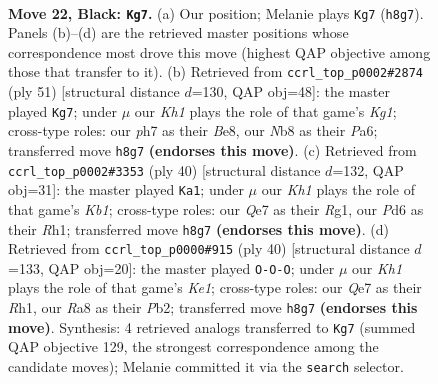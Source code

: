 \documentclass[11pt]{article}
\begin{document}
\clearpage

\begin{figure}[p]\centering
\begin{subfigure}{0.46\textwidth}\centering
\resizebox{\linewidth}{!}{%
\newchessgame
\chessboard[
  setfen={rn2r2k/p2nqp1P/3p1b2/1RpP2p1/4P1P1/1PNQ4/4N3/2B1K2R b K - 2 22},
  showmover=false,
  pgfstyle=straightmove, color=movearrow, markmove={h8-g7}
]}
\caption{}
\end{subfigure}\hfill
\begin{subfigure}{0.46\textwidth}\centering
\resizebox{\linewidth}{!}{%
\newchessgame
\chessboard[
  setfen={3rb1k1/5p1p/p1nq1np1/8/2pPP3/P1N4P/2BQN1P1/5RK1 b - - 2 26},
  showmover=false,
  pgfstyle=straightmove, color=movearrow, markmove={g8-g7}
]}
\caption{}
\end{subfigure}
\\[4pt]
\begin{subfigure}{0.46\textwidth}\centering
\resizebox{\linewidth}{!}{%
\newchessgame
\chessboard[
  setfen={r6k/pb2q1np/1p1p1np1/3Ppr2/7P/P1N1PN2/1PQ1BP2/1K4RR w - - 3 21},
  showmover=false,
  pgfstyle=straightmove, color=movearrow, markmove={b1-a1}
]}
\caption{}
\end{subfigure}\hfill
\begin{subfigure}{0.46\textwidth}\centering
\resizebox{\linewidth}{!}{%
\newchessgame
\chessboard[
  setfen={r4qnk/pp1n2rp/3p4/P1pPpb2/4N3/2N2BP1/1PP1QP2/R3K2R w KQ - 3 21},
  showmover=false,
  pgfstyle=straightmove, color=movearrow, markmove={e1-c1}
]}
\caption{}
\end{subfigure}
\caption{\textbf{Move 22, Black: \texttt{Kg7}.} (a) Our position; Melanie plays \texttt{Kg7} (\texttt{h8g7}). Panels (b)--(d) are the retrieved master positions whose correspondence most drove this move (highest QAP objective among those that transfer to it). (b) Retrieved from \texttt{ccrl\_top\_p0002\#2874} (ply 51) [structural distance $d$=130, QAP obj=48]: the master played \texttt{Kg7}; under $\mu$ our \emph{Kh1} plays the role of that game's \emph{Kg1}; cross-type roles: our \emph{p}h7 as their \emph{B}e8, our \emph{N}b8 as their \emph{P}a6; transferred move \texttt{h8g7} \textbf{(endorses this move)}. (c) Retrieved from \texttt{ccrl\_top\_p0002\#3353} (ply 40) [structural distance $d$=132, QAP obj=31]: the master played \texttt{Ka1}; under $\mu$ our \emph{Kh1} plays the role of that game's \emph{Kb1}; cross-type roles: our \emph{Q}e7 as their \emph{R}g1, our \emph{P}d6 as their \emph{R}h1; transferred move \texttt{h8g7} \textbf{(endorses this move)}. (d) Retrieved from \texttt{ccrl\_top\_p0000\#915} (ply 40) [structural distance $d$=133, QAP obj=20]: the master played \texttt{O-O-O}; under $\mu$ our \emph{Kh1} plays the role of that game's \emph{Ke1}; cross-type roles: our \emph{Q}e7 as their \emph{R}h1, our \emph{R}a8 as their \emph{P}b2; transferred move \texttt{h8g7} \textbf{(endorses this move)}. Synthesis: 4 retrieved analogs transferred to \texttt{Kg7} (summed QAP objective 129, the strongest correspondence among the candidate moves); Melanie committed it via the \texttt{search} selector.}
\label{fig:thought-m43}
\end{figure}
\end{document}
